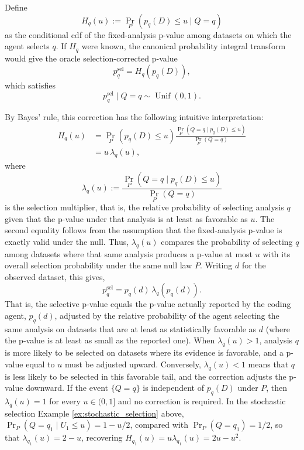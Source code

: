 \documentclass[10pt]{article}
\begin{document}
Define
\[
H_q(u):=\Pr_P\!\left(p_q(D)\leq u\mid Q=q\right)
\]
as the conditional cdf of the fixed-analysis p-value among datasets on which the agent selects $q$. If $H_q$ were known, the canonical probability integral transform would give the oracle selection-corrected p-value
\[
p_q^{\mathrm{sel}}=H_q\!\left(p_q(D)\right),
\]
which satisfies
\begin{equation}\label{eq:p_select}
p_q^{\mathrm{sel}}\mid Q=q
\sim\operatorname{Unif}(0,1).
\end{equation}

By Bayes' rule, this correction has the following intuitive interpretation:
\begin{align}
H_q(u)
&=
\Pr_P\!\left(p_q(D)\leq u\right)
\frac{\Pr_P\!\left(Q=q\mid p_q(D)\leq u\right)}
     {\Pr_P(Q=q)} \label{eq:H_q_interpretation}
\\
&=
u\,\lambda_q(u),
\end{align}
where
\[
\lambda_q(u)
:=
\frac{\Pr_P\!\left(Q=q\mid p_q(D)\leq u\right)}
     {\Pr_P(Q=q)}
\]
is the selection multiplier, that is, the relative probability of selecting analysis $q$ given that the p-value under that analysis is at least as favorable as $u$. The second equality follows from the
assumption that the fixed-analysis p-value  is exactly valid under the null. Thus, $\lambda_q(u)$ compares the probability of selecting $q$ among datasets where that same analysis produces a p-value at most $u$ with its overall selection probability under the same null law $P$.
Writing $d$ for the observed dataset, this gives,
\[
p_q^{\mathrm{sel}}
=
p_q(d)\,
\lambda_q\!\left(p_q(d)\right).
\]
That is, the selective p-value equals the p-value actually reported by the coding agent, $p_q(d)$, adjusted by the relative probability of the agent selecting the same analysis on datasets that are at least as statistically favorable as $d$ (where the p-value is at least as small as the reported one). When $\lambda_q(u)>1$, analysis $q$ is more likely to be selected
on datasets where its evidence is favorable, and a p-value equal
to $u$ must be adjusted upward. Conversely, $\lambda_q(u)<1$ means that $q$
is less likely to be selected in this favorable tail, and the
correction adjusts the p-value downward. If the event $\{Q=q\}$ is independent of $p_q(D)$ under $P$, then $\lambda_q(u)=1$ for every $u\in(0,1]$ and no correction is required. In the stochastic selection Example \ref{ex:stochastic_selection} above, $\Pr_P(Q=q_1\mid U_1\le u)=1-u/2$, compared with $\Pr_P(Q=q_1)=1/2$,
so that $\lambda_{q_1}(u)=2-u$,
recovering $H_{q_1}(u)=u\lambda_{q_1}(u)=2u-u^2$.
\end{document}
